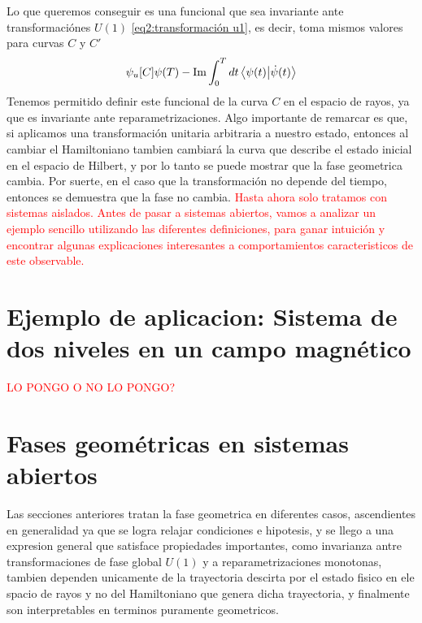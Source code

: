 Lo que queremos conseguir es una funcional que sea invariante ante transformaciónes $U(1)$ \ref{eq2:transformación u1}, es decir, toma mismos valores para curvas $C$ y $C'$
\begin{equation} \label{eq2:fg cinematica unitaria}
    \psi_u[C] \def \arg \braket{\psi(0)}{\psi(T)} - \Im \int_0^T dt \braket{\psi(t)}{\dot \psi(t)}
\end{equation}
Tenemos permitido definir este funcional de la curva $C$ en el espacio de rayos, ya que es invariante ante reparametrizaciones. Algo importante de remarcar es que, si aplicamos una transformación unitaria arbitraria a nuestro estado, entonces al cambiar el Hamiltoniano tambien cambiará la curva que describe el estado inicial en el espacio de Hilbert, y por lo tanto se puede mostrar que la fase geometrica cambia. Por suerte, en el caso que la transformación no depende del tiempo, entonces se demuestra que la fase no cambia. 
\newline
\textcolor{red}{Hasta ahora solo tratamos con sistemas aislados. Antes de pasar a sistemas abiertos, vamos a analizar un ejemplo sencillo utilizando las diferentes definiciones, para ganar intuición y encontrar algunas explicaciones interesantes a comportamientos caracteristicos de este observable.}

\section{Ejemplo de aplicacion: Sistema de dos niveles en un campo magn\'etico}\label{sec2:ejemplos}

\textcolor{red}{LO PONGO O NO LO PONGO?}

\section{Fases geométricas en sistemas abiertos}\label{sec2:sistemas abiertos}
Las secciones anteriores tratan la fase geometrica en diferentes casos, ascendientes en generalidad ya que se logra relajar condiciones e hipotesis, y se llego a una expresion general que satisface propiedades importantes, como invarianza antre transformaciones de fase global $U(1)$ y a reparametrizaciones monotonas, tambien dependen unicamente de la trayectoria descirta por el estado fisico en ele spacio de rayos y no del Hamiltoniano que genera dicha trayectoria, y finalmente son interpretables en terminos puramente geometricos. 

